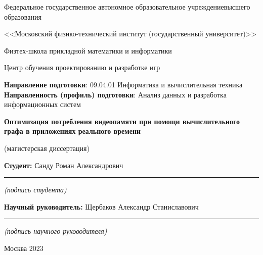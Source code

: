 
\begin{titlepage}
%
\setlength{\parskip}{0pt}
\begin{center}
    Федеральное государственное автономное образовательное учреждение\break высшего образования\par
    <<Московский физико-технический институт (государственный университет)>>\par
    Физтех-школа прикладной математики и информатики\par
    Центр обучения проектированию и разработке игр\par
\end{center}
\vspace{5mm}
\begin{small}
    {\bf Направление подготовки}: 09.04.01 Информатика и вычислительная техника\newline
    {\bf Направленность (профиль) подготовки}: Анализ данных и разработка информационных систем\par
\end{small}
%
{
    \vspace*{\fill}
    \begin{center}
        {\bf\LARGE Оптимизация потребления видеопамяти
        \break при помощи вычислительного графа
        \break в приложениях реального времени}\par
        (магистерская диссертация)
    \end{center}
    \vspace*{\fill}
}
%
\hfill %
%
\begin{minipage}[t]{8cm}
    {\bf Студент: \newline}
    Санду Роман Александрович\par
    \vspace{1mm}
    \rule{8cm}{0.15mm}\par
    \vspace{-4mm}
    \centerline{\small\it (подпись студента)}\par
    {\bf Научный руководитель: \newline}
    Щербаков Александр Станиславович\par
    \vspace{1mm}
    \rule{8cm}{0.15mm}\par
    \vspace{-4mm}
    \centerline{\small\it (подпись научного руководителя)}
\end{minipage}
%
\vspace*{\fill}
%
\begin{center}
    Москва 2023
\end{center}
%
\end{titlepage}

\restoregeometry

